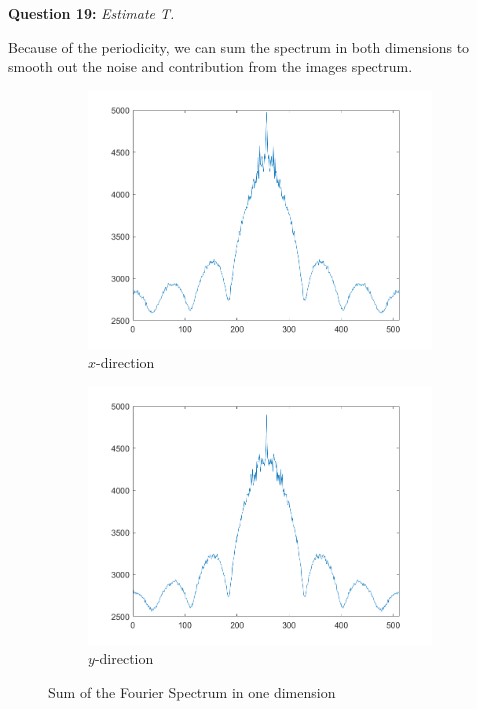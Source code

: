 \textbf{Question 19:} \textit{Estimate T.}

Because of the periodicity, we can sum the spectrum in both dimensions to smooth out the noise and contribution from the images spectrum.

\begin{figure}[!ht]
    \centering
    \hspace*{\fill}
    \begin{subfigure}{0.45\textwidth}
        \centering
        \includegraphics[width=\textwidth]{Doc/Graphics/Part1/Q19_SumX.png}
        \caption{$x$-direction}
    \end{subfigure}
    \hfill
    \begin{subfigure}{0.45\textwidth}
        \centering
        \includegraphics[width=\textwidth]{Doc/Graphics/Part1/Q19_SumY.png}
        \caption{$y$-direction}
    \end{subfigure}
    \hspace*{\fill}    
    \caption{Sum of the Fourier Spectrum in one dimension}
    \label{fig:enter-label}
\end{figure}


